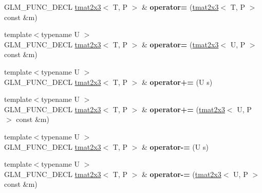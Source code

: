 \begin{DoxyCompactItemize}
\item 
G\+L\+M\+\_\+\+F\+U\+N\+C\+\_\+\+D\+E\+CL \hyperlink{structglm_1_1detail_1_1tmat2x3}{tmat2x3}$<$ T, P $>$ \& {\bfseries operator=} (\hyperlink{structglm_1_1detail_1_1tmat2x3}{tmat2x3}$<$ T, P $>$ const \&m)\hypertarget{structglm_1_1detail_1_1tmat2x3_aa725ba154586ee1bfea787036c82bc4a}{}\label{structglm_1_1detail_1_1tmat2x3_aa725ba154586ee1bfea787036c82bc4a}

\item 
{\footnotesize template$<$typename U $>$ }\\G\+L\+M\+\_\+\+F\+U\+N\+C\+\_\+\+D\+E\+CL \hyperlink{structglm_1_1detail_1_1tmat2x3}{tmat2x3}$<$ T, P $>$ \& {\bfseries operator=} (\hyperlink{structglm_1_1detail_1_1tmat2x3}{tmat2x3}$<$ U, P $>$ const \&m)\hypertarget{structglm_1_1detail_1_1tmat2x3_a449f7c79e1c6333dbc508656a698b4d9}{}\label{structglm_1_1detail_1_1tmat2x3_a449f7c79e1c6333dbc508656a698b4d9}

\item 
{\footnotesize template$<$typename U $>$ }\\G\+L\+M\+\_\+\+F\+U\+N\+C\+\_\+\+D\+E\+CL \hyperlink{structglm_1_1detail_1_1tmat2x3}{tmat2x3}$<$ T, P $>$ \& {\bfseries operator+=} (U s)\hypertarget{structglm_1_1detail_1_1tmat2x3_ae08c795a556293db526b65227c559f43}{}\label{structglm_1_1detail_1_1tmat2x3_ae08c795a556293db526b65227c559f43}

\item 
{\footnotesize template$<$typename U $>$ }\\G\+L\+M\+\_\+\+F\+U\+N\+C\+\_\+\+D\+E\+CL \hyperlink{structglm_1_1detail_1_1tmat2x3}{tmat2x3}$<$ T, P $>$ \& {\bfseries operator+=} (\hyperlink{structglm_1_1detail_1_1tmat2x3}{tmat2x3}$<$ U, P $>$ const \&m)\hypertarget{structglm_1_1detail_1_1tmat2x3_a1e667eb8ffefc6bb508032e842349bfa}{}\label{structglm_1_1detail_1_1tmat2x3_a1e667eb8ffefc6bb508032e842349bfa}

\item 
{\footnotesize template$<$typename U $>$ }\\G\+L\+M\+\_\+\+F\+U\+N\+C\+\_\+\+D\+E\+CL \hyperlink{structglm_1_1detail_1_1tmat2x3}{tmat2x3}$<$ T, P $>$ \& {\bfseries operator-\/=} (U s)\hypertarget{structglm_1_1detail_1_1tmat2x3_a3c7e03eba709ac58d92499de92386ffa}{}\label{structglm_1_1detail_1_1tmat2x3_a3c7e03eba709ac58d92499de92386ffa}

\item 
{\footnotesize template$<$typename U $>$ }\\G\+L\+M\+\_\+\+F\+U\+N\+C\+\_\+\+D\+E\+CL \hyperlink{structglm_1_1detail_1_1tmat2x3}{tmat2x3}$<$ T, P $>$ \& {\bfseries operator-\/=} (\hyperlink{structglm_1_1detail_1_1tmat2x3}{tmat2x3}$<$ U, P $>$ const \&m)\hypertarget{structglm_1_1detail_1_1tmat2x3_a5544985401df4e7457e9aa7925ad0ca5}{}\label{structglm_1_1detail_1_1tmat2x3_a5544985401df4e7457e9aa7925ad0ca5}


\end{DoxyCompactItemize}
